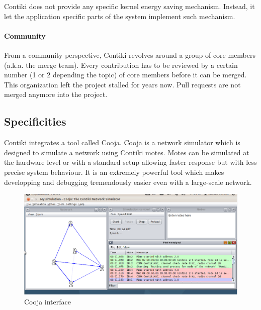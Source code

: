 Contiki does not provide any specific kernel energy saving mechanism.
Instead, it let the application specific parts of the system implement such mechanism.

\paragraph{Community} From a community perspective, Contiki revolves around a group of core members (a.k.a. the merge team)\cite{contikipr}.
Every contribution has to be reviewed by a certain number (1 or 2 depending the topic) of core members before it can be merged.
This organization left the project stalled for years now.
Pull requests are not merged anymore into the project.

\subsection{Specificities}
Contiki integrates a tool called Cooja.
Cooja is a network simulator which is designed to simulate a network using Contiki motes.
Motes can be simulated at the hardware level or with a standard setup allowing faster response but with less precise system behaviour.
It is an extremely powerful tool which makes developping and debugging tremendously easier even with a large-scale network.

\begin{figure}[!h]
    \centering
    \includegraphics[scale=0.4]{assets/cooja.png}
    \caption{\label{fig:cooja}Cooja interface}
\end{figure}

